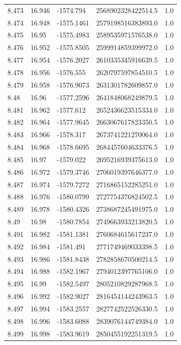 \begin{tabular}{lllll}
8.473 & 16.946 & -1574.794 & 2568902328422514.5 & 1.0 \\
8.474 & 16.948 & -1575.1461 & 2579198516383893.0 & 1.0 \\
8.475 & 16.95 & -1575.4983 & 2589535971576538.0 & 1.0 \\
8.476 & 16.952 & -1575.8505 & 2599914859399972.0 & 1.0 \\
8.477 & 16.954 & -1576.2027 & 2610335345916639.5 & 1.0 \\
8.478 & 16.956 & -1576.555 & 2620797597854510.5 & 1.0 \\
8.479 & 16.958 & -1576.9073 & 2631301782609857.0 & 1.0 \\
8.48 & 16.96 & -1577.2596 & 2641848068249879.5 & 1.0 \\
8.481 & 16.962 & -1577.612 & 2652436623515334.0 & 1.0 \\
8.482 & 16.964 & -1577.9645 & 2663067617823350.5 & 1.0 \\
8.483 & 16.966 & -1578.317 & 2673741221270064.0 & 1.0 \\
8.484 & 16.968 & -1578.6695 & 2684457604633376.5 & 1.0 \\
8.485 & 16.97 & -1579.022 & 2695216939375613.0 & 1.0 \\
8.486 & 16.972 & -1579.3746 & 2706019397646377.0 & 1.0 \\
8.487 & 16.974 & -1579.7272 & 2716865152285251.0 & 1.0 \\
8.488 & 16.976 & -1580.0799 & 2727754376824502.5 & 1.0 \\
8.489 & 16.978 & -1580.4326 & 2738687245491975.0 & 1.0 \\
8.49 & 16.98 & -1580.7854 & 2749663933213820.5 & 1.0 \\
8.491 & 16.982 & -1581.1381 & 2760684615617237.0 & 1.0 \\
8.492 & 16.984 & -1581.491 & 2771749469033398.5 & 1.0 \\
8.493 & 16.986 & -1581.8438 & 2782858670500214.5 & 1.0 \\
8.494 & 16.988 & -1582.1967 & 2794012397765106.0 & 1.0 \\
8.495 & 16.99 & -1582.5497 & 2805210829287968.5 & 1.0 \\
8.496 & 16.992 & -1582.9027 & 2816454144243963.5 & 1.0 \\
8.497 & 16.994 & -1583.2557 & 2827742522526330.5 & 1.0 \\
8.498 & 16.996 & -1583.6088 & 2839076144749384.0 & 1.0 \\
8.499 & 16.998 & -1583.9619 & 2850455192251319.5 & 1.0 \\

\end{tabular}
